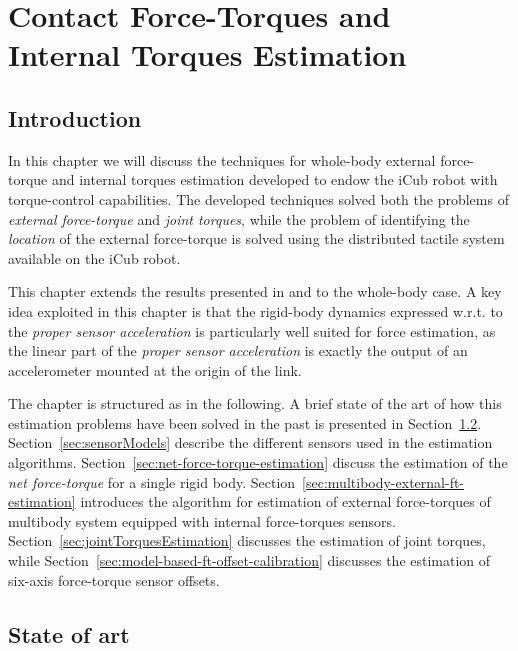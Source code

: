 \chapter{Contact Force-Torques and Internal Torques Estimation}
\label{chap:extForceAndJntTorqueEstimation}

\section{Introduction}
In this chapter we will discuss the techniques for whole-body external force-torque  and internal torques estimation developed to endow the iCub robot with torque-control capabilities. 
The developed techniques solved both the problems of \emph{external force-torque} and \emph{joint torques}, while the problem of identifying the \emph{location} of the external force-torque is solved using the distributed tactile system available on the iCub robot. 

This chapter extends the results presented in \citep{Fumagalli2012,DelPrete2016} and \citep{DelPrete2012} to the whole-body case. A key idea exploited in this chapter is that the rigid-body dynamics expressed w.r.t. to the \emph{proper sensor acceleration} is particularly well suited for force estimation, as the linear part of the  \emph{proper sensor acceleration} is exactly the output of an accelerometer mounted at the origin of the link. 

The chapter is structured as in the following. A brief state of the art of how this estimation problems have been solved in the past is presented in Section~\ref{sec:state-of-art-ft-estimation}. Section~\ref{sec:sensorModels} describe the different sensors used in the estimation algorithms. Section~\ref{sec:net-force-torque-estimation} discuss the estimation of the \emph{net force-torque} for a single rigid body. Section~\ref{sec:multibody-external-ft-estimation} introduces the algorithm for estimation of external force-torques of multibody system equipped with internal force-torques sensors. 
Section~\ref{sec:jointTorquesEstimation} discusses the estimation of joint torques, while Section~\ref{sec:model-based-ft-offset-calibration} discusses the estimation of six-axis force-torque sensor offsets. 

\section{State of art}
\label{sec:state-of-art-ft-estimation}


